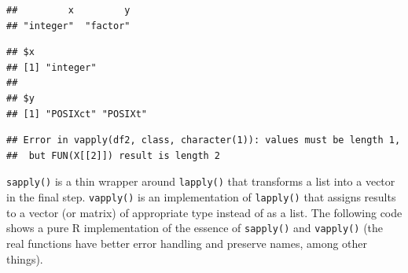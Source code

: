 \begin{verbatim}
##         x         y 
## "integer"  "factor"
\end{verbatim}

\begin{Shaded}
\begin{Highlighting}[]
\StringTok{ }\NormalTok{(} \OperatorTok{:}\NormalTok{, } \NormalTok{() }\OperatorTok{+}\StringTok{ }\OperatorTok{:}\NormalTok{)}
\end{Highlighting}
\end{Shaded}

\begin{verbatim}
## $x
## [1] "integer"
## 
## $y
## [1] "POSIXct" "POSIXt"
\end{verbatim}

\begin{Shaded}
\begin{Highlighting}[]
\NormalTok{(}\NormalTok{))}
\end{Highlighting}
\end{Shaded}

\begin{verbatim}
## Error in vapply(df2, class, character(1)): values must be length 1,
##  but FUN(X[[2]]) result is length 2
\end{verbatim}

\texttt{sapply()} is a thin wrapper around \texttt{lapply()} that
transforms a list into a vector in the final step. \texttt{vapply()} is
an implementation of \texttt{lapply()} that assigns results to a vector
(or matrix) of appropriate type instead of as a list. The following code
shows a pure R implementation of the essence of \texttt{sapply()} and
\texttt{vapply()} (the real functions have better error handling and
preserve names, among other things).

